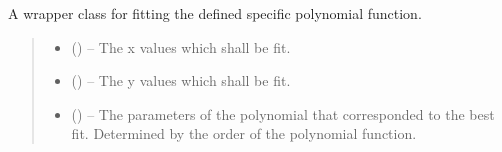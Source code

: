 \documentclass[letterpaper,11pt,english]{sphinxmanual}
\begin{document}
\begin{savenotes}
\begin{fulllineitems}
\begin{savenotes}\begin{fulllineitems}
\label{\detokenize{code/opihiexarata.propagate.polynomial:opihiexarata.propagate.polynomial.QuadraticPropagationEngine.__fit_polynomial_function}}
\pysigstartsignatures
{}
\pysigstopsignatures
\sphinxAtStartPar
A wrapper class for fitting the defined specific polynomial function.
\begin{quote}\begin{description}
\begin{itemize}
\item {} 
\sphinxAtStartPar
{} () – The x values which shall be fit.

\item {} 
\sphinxAtStartPar
{} () – The y values which shall be fit.

\end{itemize}

\sphinxAtStartPar
\begin{itemize}
\item {} 
\sphinxAtStartPar
{} () – The parameters of the polynomial that corresponded to the best fit.
Determined by the order of the polynomial function.


\end{itemize}
\end{description}
\end{quote}
\end{fulllineitems}
\end{savenotes}
\end{fulllineitems}
\end{savenotes}
\end{document}
